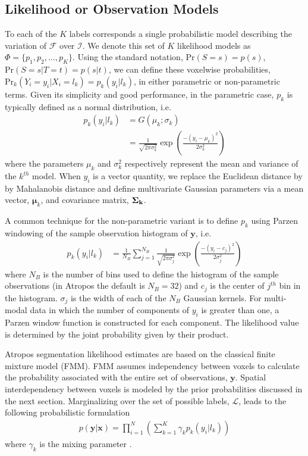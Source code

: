 \documentclass[11pt,english]{article}
\begin{document}
\subsection{Likelihood or Observation Models}
To each of the $K$ labels corresponds a single probabilistic model describing the variation of $\mathcal{F}$ over $\mathcal{I}$.  We denote this set of $K$ likelihood models as $\Phi = \{p_1, p_2, \ldots, p_K\}$.  Using the standard notation, $\mathrm{Pr}(S=s) = p(s)$, $\mathrm{Pr}(S=s|T=t) = p(s|t)$, we can define these voxelwise probabilities, $\mathrm{Pr}_k( Y_i = y_i | X_i = l_k ) = p_k(y_i|l_k)$, in either parametric or non-parametric terms.   Given its simplicity and good performance, in the parametric case, $p_k$ is typically defined as a normal distribution, i.e.
\begin{align}\label{eq:param}
  p_k\left(y_i|l_k\right) &= G\left(\mu_k;\sigma_k\right) \nonumber \\
                    &= \frac{1}{\sqrt{2\pi \sigma_k^2}}\exp\left( \frac{ -(y_i - \mu_k)^2 }{2\sigma_k^2} \right)
\end{align}
where the parameters $\mu_k$ and $\sigma_k^2$ respectively represent
the mean and variance of the $k^{th}$ model.  When $y_i$ is a vector
quantity, we replace the Euclidean distance by by Mahalanobis distance
and define multivariate Gaussian parameters via a mean vector,
$\boldsymbol{\mu}_k$, and covariance matrix, ${\bf \Sigma_k}$.

A common technique for the non-parametric variant is to define $p_k$ using Parzen windowing of the sample observation histogram of $\mathbf{y}$, i.e.
\begin{align} \label{eq:nonparam}
  p_k\left(y_i|l_k\right) &= \frac{1}{N_B} \sum_{j=1}^{N_B} \frac{1}{\sqrt{2\pi \sigma_j^2}}\exp\left( \frac{ -(y_i - c_j)^2 }{2\sigma_j^2} \right)
\end{align}
where $N_B$ is the number of bins used to define the histogram of the sample observations (in Atropos the default is $N_B = 32$) and $c_j$ is the center of $j^{th}$ bin in the histogram.  $\sigma_j$ is the width of each of the $N_B$ Gaussian kernels.  For multi-modal data in which the number of components of $y_i$ is greater than one, a Parzen window function is constructed for each component.  The likelihood value is determined by the joint probability given by their product.

Atropos segmentation likelihood estimates are based on the classical finite mixture model (FMM).
FMM assumes independency between voxels to calculate the probability
associated with the entire set of observations, $\mathbf{y}$.  Spatial
interdependency between voxels is modeled by the prior probabilities
discussed in the next section.  Marginalizing over the set of possible labels, $\mathcal{L}$, leads to the following probabilistic formulation
\begin{align}\label{eq:likelihood}
  p(\mathbf{y}|\mathbf{x}) = \prod_{i=1}^N \left(      
                                                        \sum_{k=1}^K \gamma_k p_k(y_i|l_k)
                                                        \right)
\end{align}
where $\gamma_k$ is the mixing parameter \citep{Ashburner2005}.  
\end{document}

